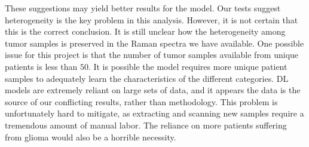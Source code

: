 These suggestions may yield better results for the model. Our tests suggest heterogeneity is the key problem in this analysis. However, it is not certain that this is the correct conclusion. It is still unclear how the heterogeneity among tumor samples is preserved in the Raman spectra we have available. One possible issue for this project is that the number of tumor samples available from unique patients is less than $50$. It is possible the model requires more unique patient samples to adequately learn the characteristics of the different categories. DL models are extremely reliant on large sets of data, and it appears the data is the source of our conflicting results, rather than methodology. This problem is unfortunately hard to mitigate, as extracting and scanning new samples require a tremendous amount of manual labor. The reliance on more patients suffering from glioma would also be a horrible necessity.